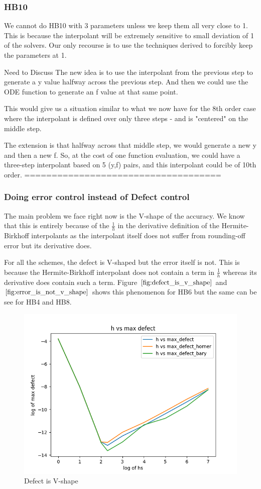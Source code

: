 \documentclass{article}
\begin{document}
\subsubsection{HB10}
We cannot do HB10 with 3 parameters unless we keep them all very close to 1. This is because the interpolant will be extremely sensitive to small deviation of 1 of the solvers.
Our only recourse is to use the techniques derived to forcibly keep the parameters at 1. 


Need to Discuss
The new idea is to use the interpolant from the previous step to generate
a y value halfway across the previous step. And then we could
use the ODE function to generate an f value at that same point.

This would give us a situation similar to what we now have for the
8th order case where the interpolant is defined over only three
steps - and is "centered" on the middle step.

The extension is that halfway across that middle step, we would
generate a new y and then a new f. So, at the cost of one
function evaluation, we could have a three-step interpolant
based on 5 (y,f)  pairs, and this interpolant could be of 10th order.
====================================

\subsubsection{Doing error control instead of Defect control}
The main problem we face right now is the V-shape of the accuracy. We know that this is entirely because of the $\frac{1}{h}$ in the derivative definition of the Hermite-Birkhoff interpolants as the interpolant itself does not suffer from rounding-off error but its derivative does.

For all the schemes, the defect is V-shaped but the error itself is not. This is because the Hermite-Birkhoff interpolant does not contain a term in $\frac{1}{h}$ whereas its derivative does contain such a term. Figure $\ref{fig:defect_is_v_shape}$ and $\ref{fig:error_is_not_v_shape}$ shows this phenomenon for HB6 but the same can be see for HB4 and HB8. 

\begin{figure}[H]
\centering
\includegraphics[width=0.7\linewidth]{./figures/further_work_defect_is_v_shape_hb6}
\caption{Defect is V-shape}
\label{fig:defect_is_v_shape}
\end{figure}
\end{document}
